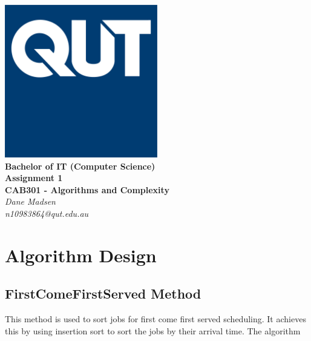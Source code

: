 \documentclass[12pt,a4paper]{article}
\begin{document}
	\begin{titlepage}
		
		\begin{center}
			\includegraphics[width=0.5\textwidth]{QUT.jpg}\\
			[0.03\textheight]  
			\Large\textbf{Bachelor of IT (Computer Science)}\\
			\Large\textbf{Assignment 1}\\
			\large\textbf{CAB301 - Algorithms and Complexity}\\
			[0.02\textheight]
			\large\textsl{Dane Madsen}\\
			\large\textsl{n10983864@qut.edu.au}
		\end{center}
		
	\end{titlepage}
	\tableofcontents
	\newpage
	
	\section{Algorithm Design}
		\subsection{FirstComeFirstServed Method}
			This method is used to sort jobs for first come first served scheduling. It achieves 
			this by using insertion sort to sort the jobs by their arrival time. The algorithm 
			
\end{document}
